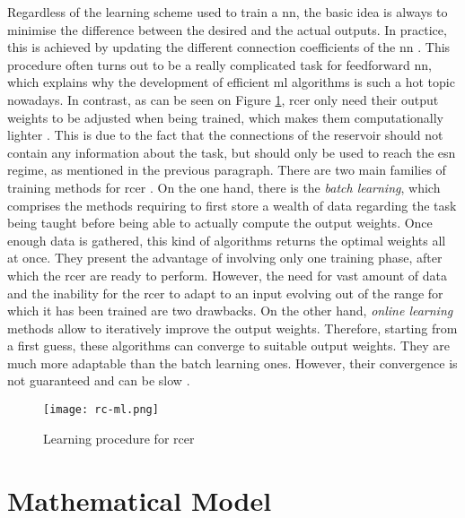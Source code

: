 Regardless of the learning scheme used to train a \gls{nn}, the basic idea is always to minimise the difference between the desired and the actual outputs. In practice, this is achieved by updating the different connection coefficients of the \gls{nn} \cite[p.233]{bishop2006pattern}\cite[p.733]{russell2010artificial}. This procedure often turns out to be a really complicated task for feedforward \gls{nn}, which explains why the development of efficient \gls{ml} algorithms is such a hot topic nowadays. In contrast, as can be seen on Figure \ref{rc-ml}, \gls{rcer} only need their output weights to be adjusted when being trained, which makes them computationally lighter \cite{Jaeger2004}. This is due to the fact that the connections of the reservoir should not contain any information about the task, but should only be used to reach the \gls{esn} regime, as mentioned in the previous paragraph. There are two main families of training methods for \gls{rcer} \cite{Jaeger2002}. On the one hand, there is the \textit{batch learning}, which comprises the methods requiring to first store a wealth of data regarding the task being taught before being able to actually compute the output weights. Once enough data is gathered, this kind of algorithms returns the optimal weights all at once. They present the advantage of involving only one training phase, after which the \gls{rcer} are ready to perform. However, the need for vast amount of data and the inability for the \gls{rcer} to adapt to an input evolving out of the range for which it has been trained are two drawbacks. On the other hand, \textit{online learning} methods allow to iteratively improve the output weights. Therefore, starting from a first guess, these algorithms can converge to suitable output weights. They are much more adaptable than the batch learning ones. However, their convergence is not guaranteed and can be slow \cite{JaegerTraining, schrauwen}.

\begin{figure}[h]
	\centering
	\texttt{[image: rc-ml.png]}
	\caption{Learning procedure for \acrlong{rcer} \cite{Goudarzi2014ACS}}
	\label{rc-ml}
\end{figure}


\section{Mathematical Model}

\label{rc-mathematical-model}

